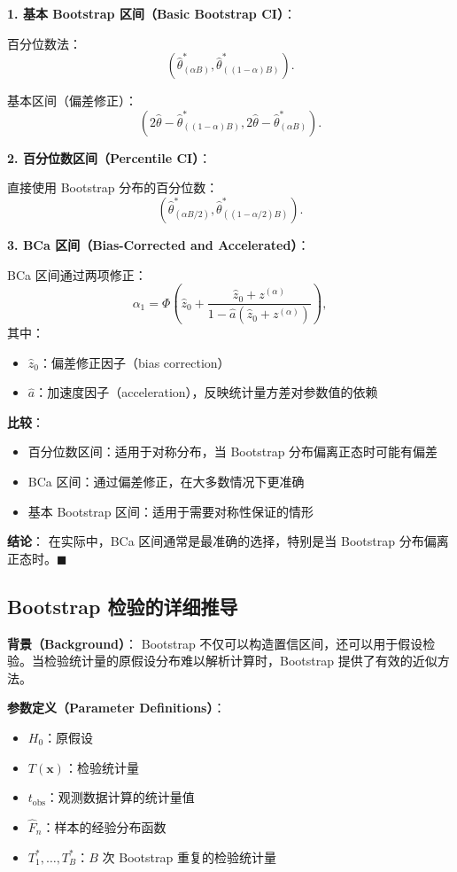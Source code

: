 \textbf{1. 基本 Bootstrap 区间（Basic Bootstrap CI）}：

百分位数法：
\[
\left( \widehat{\theta}^*_{(\alpha B)}, \widehat{\theta}^*_{((1-\alpha)B)} \right).
\]

基本区间（偏差修正）：
\[
\left( 2\widehat{\theta} - \widehat{\theta}^*_{((1-\alpha)B)}, 2\widehat{\theta} - \widehat{\theta}^*_{(\alpha B)} \right).
\]

\textbf{2. 百分位数区间（Percentile CI）}：

直接使用 Bootstrap 分布的百分位数：
\[
\left( \widehat{\theta}^*_{(\alpha B/2)}, \widehat{\theta}^*_{((1-\alpha/2)B)} \right).
\]

\textbf{3. BCa 区间（Bias-Corrected and Accelerated）}：

BCa 区间通过两项修正：
\[
\alpha_1 = \Phi\left( \widehat{z}_0 + \frac{\widehat{z}_0 + z^{(\alpha)}}{1 - \widehat{a}(\widehat{z}_0 + z^{(\alpha)})} \right),
\]
其中：
\begin{itemize}
\item $\widehat{z}_0$：偏差修正因子（bias correction）
\item $\widehat{a}$：加速度因子（acceleration），反映统计量方差对参数值的依赖
\end{itemize}

\textbf{比较}：
\begin{itemize}
\item 百分位数区间：适用于对称分布，当 Bootstrap 分布偏离正态时可能有偏差
\item BCa 区间：通过偏差修正，在大多数情况下更准确
\item 基本 Bootstrap 区间：适用于需要对称性保证的情形
\end{itemize}

\textbf{结论}：
在实际中，BCa 区间通常是最准确的选择，特别是当 Bootstrap 分布偏离正态时。$\blacksquare$

\subsection{Bootstrap 检验的详细推导}\label{sec:derivation-bootstrap-test}

\textbf{背景（Background）}：
Bootstrap 不仅可以构造置信区间，还可以用于假设检验。当检验统计量的原假设分布难以解析计算时，Bootstrap 提供了有效的近似方法。

\textbf{参数定义（Parameter Definitions）}：
\begin{itemize}
\item $H_0$：原假设
\item $T(\mathbf{x})$：检验统计量
\item $t_{\text{obs}}$：观测数据计算的统计量值
\item $\widehat{F}_n$：样本的经验分布函数
\item $T^*_1, \ldots, T^*_B$：$B$ 次 Bootstrap 重复的检验统计量
\end{itemize}

